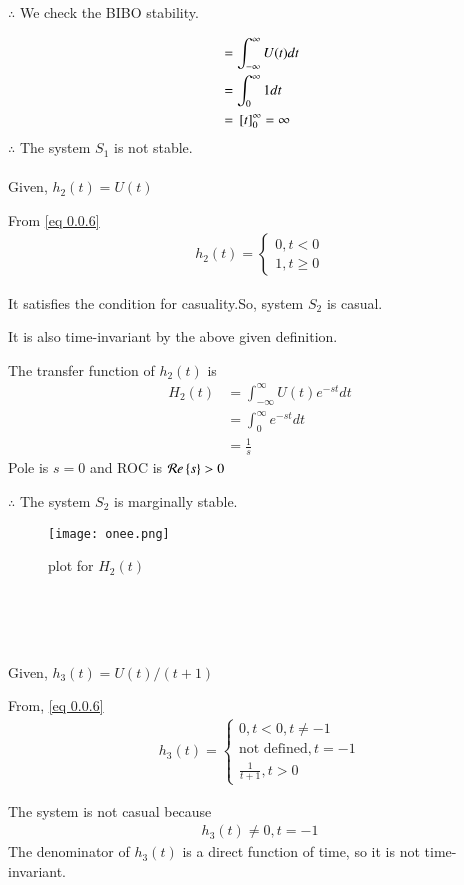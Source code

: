 \documentclass[journal,12pt,twocolumn]{IEEEtran}
\begin{document}
$\therefore$ We check the BIBO stability.

\begin{align}
    &= \int_{-\infty}^{\infty} U(t) dt\\
    &= \int_0^{\infty} 1 dt\\
    &= {}\left[t\right]_0^{\infty} = \infty
\end{align}
$\therefore$ The system $S_1$ is not stable.\\\\
Given, $h_2(t) = U(t)$

From \eqref{eq 0.0.6}
\begin{align}
    h_2(t) = 
    \begin{cases}
    0, t<0\\
    1, t\geq 0
    \end{cases}
\end{align}

It satisfies the condition for casuality.So, system $S_2$ is casual.

It is also time-invariant by the above given definition.

The transfer function of $h_2(t)$ is
    \begin{align}
        H_2(t) &= \int_{-\infty}^{\infty} U(t)e^{-st} dt\\
        &= \int_{0}^{\infty} e^{-st} dt\\
        &= \frac{1}{s}
    \end{align}
Pole is $s = 0$ and ROC is $ \mathcal{R}e\left\{s\right\} > 0$

$\therefore$ The system $S_2$ is marginally stable.
\begin{figure}[htp]
    \centering
    \texttt{[image: onee.png]}
    \caption{plot for $H_2(t)$}
    \label{fig:my_label}
\end{figure}\\\\\

Given, $h_3(t) = {U(t)}/{(t+1)}$

From, \eqref{eq 0.0.6}
\begin{align}
    h_3(t) = 
    \begin{cases}
    0, {t<0, t \neq -1}\\
    \text{not defined}, t = -1\\
    \frac{1}{t+1} , t > 0
    \end{cases}
\end{align}

The system is not casual because 
\begin{align}
h_3(t) \neq 0, t = -1
\end{align}
The denominator of $h_3(t)$ is a direct function of time, so it is not time-invariant.
\end{document}
